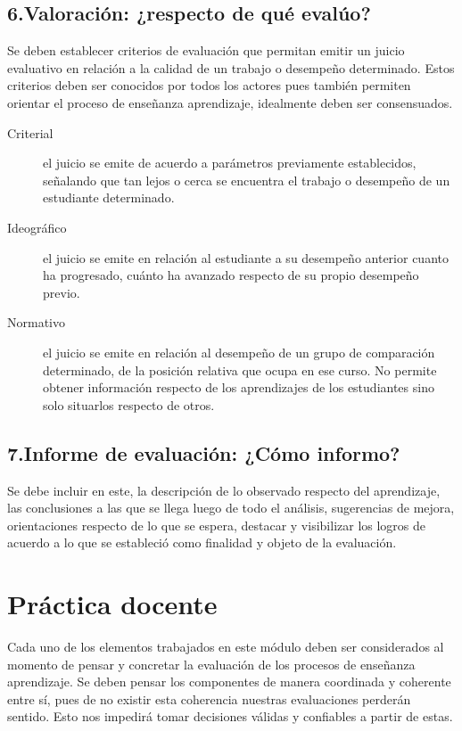 \documentclass[12pt,letterpaper,article,x11names]{memoir}
\begin{document}
\subsection{6.Valoración: ¿respecto de qué evalúo?}
\label{sec:org551a5ae}
Se deben establecer criterios de evaluación que permitan emitir un juicio evaluativo en relación a la calidad de un trabajo o desempeño determinado. Estos criterios deben ser conocidos por todos los actores pues también permiten orientar el proceso de enseñanza aprendizaje, idealmente deben ser consensuados.

\begin{description}
\item[{Criterial}] el juicio se emite de acuerdo a parámetros previamente establecidos, señalando que tan lejos o cerca se encuentra el trabajo o desempeño de un estudiante determinado.

\item[{Ideográfico}] el juicio se emite en relación al estudiante a su desempeño anterior cuanto ha progresado, cuánto ha avanzado respecto de su propio desempeño previo.

\item[{Normativo}] el juicio se emite en relación al desempeño de un grupo de comparación determinado, de la posición relativa que ocupa en ese curso. No permite obtener información respecto de los aprendizajes de los estudiantes sino solo situarlos respecto de otros.
\end{description}

\subsection{7.Informe de evaluación: ¿Cómo informo?}
\label{sec:orgc403797}
Se debe incluir en este, la descripción de lo observado respecto del aprendizaje, las conclusiones a las que se llega luego de todo el análisis, sugerencias de mejora, orientaciones respecto de lo que se espera, destacar y visibilizar los logros de acuerdo a lo que se estableció como finalidad y objeto de la evaluación.

\section{Práctica docente}
\label{sec:orgdd1ab34}
Cada uno de los elementos trabajados en este módulo deben ser considerados al momento de pensar y concretar la evaluación de los procesos de enseñanza aprendizaje. Se deben pensar los componentes de manera coordinada y coherente entre sí, pues de no existir esta coherencia nuestras evaluaciones perderán sentido. Esto nos impedirá tomar decisiones válidas y confiables a partir de estas. 
\end{document}
